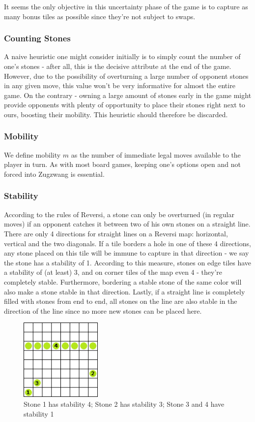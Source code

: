\documentclass[a4paper,12pt]{article}
\begin{document}
It seems the only objective in this uncertainty phase of the game is to capture as many bonus tiles as possible since they're not subject to swaps.


\subsubsection{Counting Stones}
A naive heuristic one might consider initially is to simply count the number of one's stones - after all, this is the decisive attribute at the end of the game. However, due to the possibility of overturning a large number of opponent stones in any given move, this value won't be very informative for almost the entire game. On the contrary - owning a large amount of stones early in the game might provide opponents with plenty of opportunity to place their stones right next to ours, boosting their mobility. This heuristic should therefore be discarded.


\subsubsection{Mobility}
We define mobility $m$ as the number of immediate legal moves available to the player in turn. As with most board games, keeping one's options open and not forced into Zugzwang is essential. 


\subsubsection{Stability}
According to the rules of Reversi, a stone can only be overturned (in regular moves) if an opponent catches it between two of his own stones on a straight line. There are only 4 directions for straight lines on a Reversi map: horizontal, vertical and the two diagonals. If a tile borders a hole in one of these 4 directions, any stone placed on this tile will be immune to capture in that direction - we say the stone has a stability of 1. According to this measure, stones on edge tiles have a stability of (at least) 3, and on corner tiles of the map even 4 - they're completely stable. Furthermore, bordering a stable stone of the same color will also make a stone stable in that direction. Lastly, if a straight line is completely filled with stones from end to end, all stones on the line are also stable in the direction of the line since no more new stones can be placed here.

\begin{figure}[H]
    \centering
    \includegraphics[height=4cm]{pictures/assignment1/Stability.png}
    \caption{Stone 1 has stability 4; Stone 2 has stability 3; Stone 3 and 4 have stability 1}
    \label{fig:Stability}
\end{figure}
\end{document}
